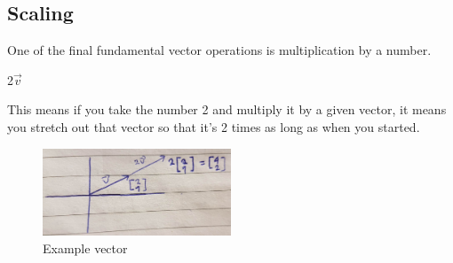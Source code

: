 \documentclass{article}
\begin{document}
\begin{center}
    \section{Scaling}
\end{center}

One of the final fundamental vector operations is multiplication by a number. 

\begin{center}
    2$\vec{v}$
\end{center}

This means if you take the number 2 and multiply it by a given vector, it means you stretch out that vector so that it's 2 times as long as when you started.

\begin{figure}[H]
    \centering
    \includegraphics[width=0.5\textwidth, height=0.25\textwidth]{la_8.png}
    \caption{Example vector}
    \label{fig8}
\end{figure}
\end{document}
